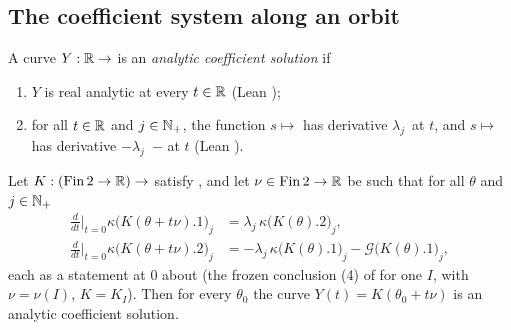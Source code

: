 \subsection{The coefficient system along an orbit}\label{bpW:w2:orbit-sec}

\begin{definition}\label{bpW:w2:coeffsol}
A curve $Y:\mathbb{R}\to$  is an \emph{analytic coefficient solution} if
\begin{enumerate}[label=(C\arabic*)]
\item\label{bpW:w2:C1} $Y$ is real analytic at every $t\in\mathbb{R}$ (Lean );
\item\label{bpW:w2:C2} for all $t\in\mathbb{R}$ and $j\in\mathbb{N}_+$, the function $s\mapsto$  has derivative
  $\lambda_j\,$ at $t$, and $s\mapsto$  has derivative
  $-\lambda_j\,$ $-$  at $t$ (Lean ).
\end{enumerate}
\end{definition}

\begin{lemma}\label{bpW:w2:orbit}
Let $K:(\mathrm{Fin}\,2\to\mathbb{R})\to$  satisfy , and let
$\nu\in\mathrm{Fin}\,2\to\mathbb{R}$ be such that for all $\theta$ and $j\in\mathbb{N}_+$
\begin{equation}\label{bpW:w2:inv}
\begin{aligned}
\frac{d}{dt}\Big|_{t=0}\kappa\bigl(K(\theta+t\nu).1\bigr)_j&=\lambda_j\,\kappa\bigl(K(\theta).2\bigr)_j,\\
\frac{d}{dt}\Big|_{t=0}\kappa\bigl(K(\theta+t\nu).2\bigr)_j&=-\lambda_j\,\kappa\bigl(K(\theta).1\bigr)_j-\mathcal G\bigl(K(\theta).1\bigr)_j,
\end{aligned}
\end{equation}
each as a  statement at $0$ about 
(the frozen conclusion (4) of  for one $I$, with $\nu=\nu(I)$, $K=K_I$). Then for every $\theta_0$ the
curve $Y(t)=K(\theta_0+t\nu)$ is an analytic coefficient solution.
\end{lemma}

